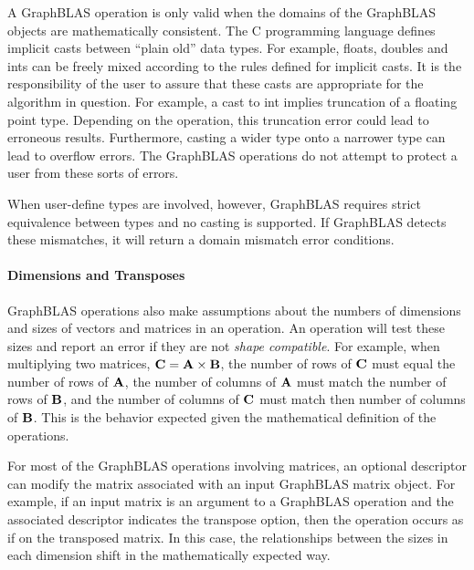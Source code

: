 A GraphBLAS operation is only valid when the domains of the GraphBLAS objects are
mathematically consistent.  The C programming language defines implicit casts 
between ``plain old'' data types.  For example, floats, doubles and ints can be 
freely mixed according to the rules defined for implicit casts.  It is the 
responsibility of the user to assure that these casts are appropriate for the 
algorithm in question.  For example, a cast to int implies truncation of a floating 
point type.  Depending on the operation, this truncation error could lead to
erroneous results.  Furthermore, casting a wider type onto a narrower type can lead 
to overflow errors.  The GraphBLAS operations do not attempt to protect a user from 
these sorts of errors.

When user-define types are involved, however, GraphBLAS requires strict equivalence
between types and no casting is supported.  If GraphBLAS detects these mismatches,
it will return a domain mismatch error conditions.


\paragraph{Dimensions and Transposes}

GraphBLAS operations also make assumptions about the numbers of dimensions and 
sizes of vectors and matrices in an operation.   An operation will test these 
sizes and report an error if they are not \emph{shape compatible}.  For example, when multiplying 
two matrices, ${\bf C} = {\bf A} \times {\bf B}$, the number of rows of 
${\bf C}$ must equal the number of rows of ${\bf A}$, the number of columns 
of ${\bf A}$ must match the number of rows of ${\bf B}$, and the number of 
columns of ${\bf C}$ must match then number of columns of ${\bf B}$.  This 
is the behavior expected given the mathematical definition of the operations.   

For most of the GraphBLAS operations involving matrices, an optional descriptor 
can modify the matrix associated with an input GraphBLAS matrix object.  For 
example, if an input matrix is an argument to a GraphBLAS operation and the 
associated descriptor indicates the transpose option, then the operation occurs 
as if on the transposed matrix.  In this case, the relationships between the 
sizes in each dimension shift in the mathematically expected way. 

